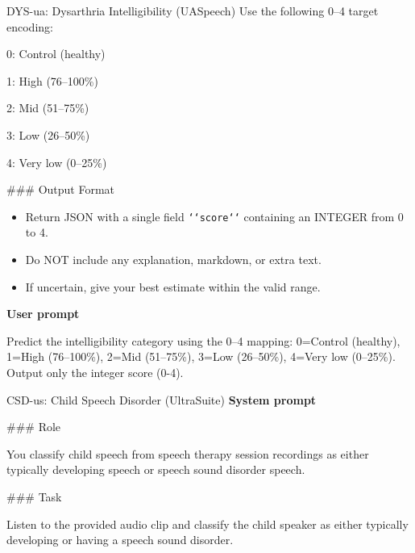 {\begin{promptbox}{DYS-ua: Dysarthria Intelligibility (UASpeech)}
Use the following 0--4 target encoding:
\par
\hspace*{1em}0: Control (healthy)\par
\hspace*{1em}1: High (76--100\%)\par
\hspace*{1em}2: Mid (51--75\%)\par
\hspace*{1em}3: Low (26--50\%)\par
\hspace*{1em}4: Very low (0--25\%)
\par\vspace{2pt}

\noindent\#\#\# Output Format
\par
\begin{itemize}[leftmargin=*,noitemsep,topsep=2pt]
  \item Return JSON with a single field \texttt{\string`\string`score\string`\string`} containing an INTEGER from 0 to 4.
  \item Do NOT include any explanation, markdown, or extra text.
  \item If uncertain, give your best estimate within the valid range.
\end{itemize}

\par\vspace{2pt}
\textbf{User prompt}\par\vspace{2pt}
\noindent
Predict the intelligibility category using the 0--4 mapping: 0=Control (healthy), 1=High (76--100\%), 2=Mid (51--75\%), 3=Low (26--50\%), 4=Very low (0--25\%). Output only the integer score (0-4).
\end{promptbox}

\par\vspace{4pt}
\begin{promptbox}{CSD-us: Child Speech Disorder (UltraSuite)}
\textbf{System prompt}\par\vspace{2pt}
\noindent\#\#\# Role
\par
You classify child speech from speech therapy session recordings as either typically developing speech or speech sound disorder speech.
\par\vspace{2pt}

\noindent\#\#\# Task
\par
Listen to the provided audio clip and classify the child speaker as either typically developing or having a speech sound disorder.
\par\vspace{2pt}


\end{promptbox}}
